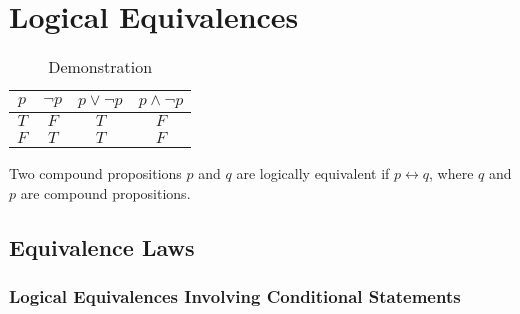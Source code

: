 \documentclass[12pt letter]{report}
\begin{document}
\chapter{Logical Equivalences}




\begin{table}[h!]
	\caption{Demonstration}\label{tab:}
	\begin{center}
		\begin{tabular}{|c c|c|c|}
			\hline
			$p$ & $\neg p$ & $p \vee \neg p$ & $p \wedge \neg p$ \\ [0.5ex]
			\hline
			\hline
			$T$ & $F$      & $T$             & $F$               \\
			$F$ & $T$      & $T$             & $F$               \\
			\hline
		\end{tabular}
	\end{center}
\end{table}

Two compound propositions $p$ and $q$ are logically equivalent if $p \leftrightarrow q$, where $q$ and $p$ are compound propositions.

\section{Equivalence Laws}

\subsection{Logical Equivalences Involving Conditional Statements}
\end{document}
